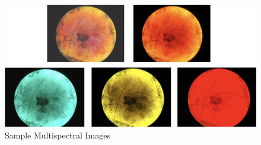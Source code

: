 \begin{figure}
    \centerline{\includegraphics[width=1\columnwidth]{02-related-works/figures/sample-multispectral-images.png}}
    \caption{Sample Multispectral Images \cite{dhawan2009multispectral}}
    \label{figure:sample-multispectral-images}
\end{figure}